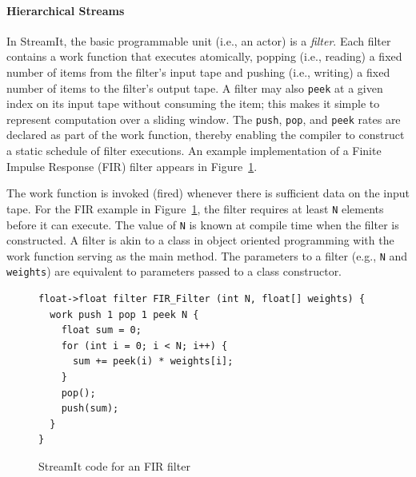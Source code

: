 \documentclass{sigplanconf}
\begin{document}
\paragraph*{Hierarchical Streams}
In  StreamIt, the  basic programmable  unit (i.e., an actor) is a {\it
filter}.   Each filter contains  a work  function that executes
atomically,  popping (i.e., reading)  a fixed number  of items  from
the  filter's input  tape and pushing (i.e., writing) a fixed number
of items to the filter's output tape.  A filter  may also {\tt peek} at
a given index  on its input tape without  consuming  the  item;  this
makes  it  simple  to  represent computation over a
sliding window.   The {\tt push}, {\tt pop}, and {\tt peek} rates are
declared as part  of  the work  function,  thereby enabling  the
compiler  to construct a static schedule of filter executions. An example
implementation of a Finite Impulse Response (FIR) filter appears in Figure~\ref{fig:fir}.

The work function is invoked (fired) whenever there is sufficient data
on the input tape. For the FIR example in Figure~\ref{fig:fir}, the
filter requires at least \texttt{N} elements before it can
execute. The value of \texttt{N} is known at compile time when the
filter is constructed. A filter is akin to a class in object oriented
programming with the work function serving as the main method. The
parameters to a filter (e.g., \texttt{N} and \texttt{weights}) are
equivalent to parameters passed to a class constructor.

\begin{figure}[t]
\begin{scriptsize}
\begin{verbatim}
float->float filter FIR_Filter (int N, float[] weights) {
  work push 1 pop 1 peek N {
    float sum = 0;
    for (int i = 0; i < N; i++) {
      sum += peek(i) * weights[i];
    }
    pop();
    push(sum);
  }
}
\end{verbatim}
\end{scriptsize}
\vspace{-3pt}
\caption{StreamIt code for an FIR filter\label{fig:fir}}
\end{figure}
\end{document}
